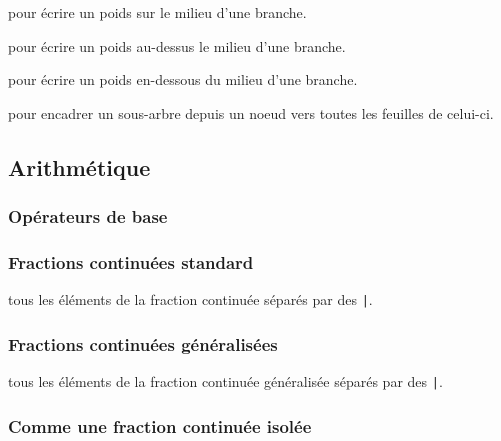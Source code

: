 \documentclass[12pt,a4paper]{article}
\theoremstyle{definition}
\newcommand\extraspace{
	\vspace{0.25em}
}
\begin{document}
 pour écrire un poids sur le milieu d'une branche.

 pour écrire un poids au-dessus le milieu d'une branche.

 pour écrire un poids en-dessous du milieu d'une branche.

 pour encadrer un sous-arbre depuis un noeud vers toutes les feuilles de celui-ci.
\subsection{Arithmétique}

\subsubsection{Opérateurs de base}



\extraspace

\subsubsection{Fractions continuées standard}



\IDarg{} tous les éléments de la fraction continuée séparés par des \verb+|+.





\subsubsection{Fractions continuées généralisées}



\IDarg{} tous les éléments de la fraction continuée généralisée séparés par des \verb+|+.





\subsubsection{Comme une fraction continuée isolée}

\end{document}
